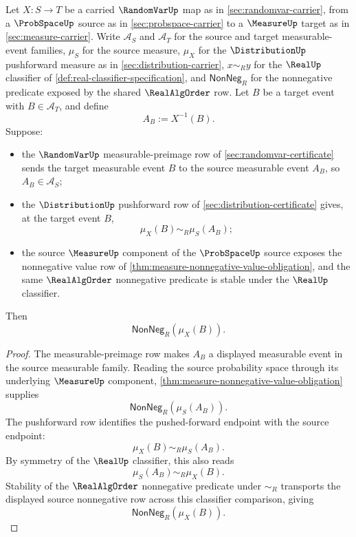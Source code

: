 \begin{theorem}
\label{thm:distribution-nonnegative-value-inheritance}
Let $X:S\to T$ be a carried $\RandomVarUp$ map as in \autoref{sec:randomvar-carrier}, from a $\ProbSpaceUp$ source as in \autoref{sec:probspace-carrier} to a $\MeasureUp$ target as in \autoref{sec:measure-carrier}. Write $\mathcal{A}_S$ and $\mathcal{A}_T$ for the source and target measurable-event families, $\mu_S$ for the source measure, $\mu_X$ for the $\DistributionUp$ pushforward measure as in \autoref{sec:distribution-carrier}, $x\sim_R y$ for the $\RealUp$ classifier of \autoref{def:real-classifier-specification}, and $\mathsf{NonNeg}_R$ for the nonnegative predicate exposed by the shared $\RealAlgOrder$ row. Let $B$ be a target event with $B\in\mathcal{A}_T$, and define
$$
A_B:=X^{-1}(B).
$$
Suppose:
\begin{itemize}
\item the $\RandomVarUp$ measurable-preimage row of \autoref{sec:randomvar-certificate} sends the target measurable event $B$ to the source measurable event $A_B$, so $A_B\in\mathcal{A}_S$;
\item the $\DistributionUp$ pushforward row of \autoref{sec:distribution-certificate} gives, at the target event $B$,
$$
\mu_X(B)\sim_R\mu_S(A_B);
$$
\item the source $\MeasureUp$ component of the $\ProbSpaceUp$ source exposes the nonnegative value row of \autoref{thm:measure-nonnegative-value-obligation}, and the same $\RealAlgOrder$ nonnegative predicate is stable under the $\RealUp$ classifier.
\end{itemize}
Then
$$
\mathsf{NonNeg}_R(\mu_X(B)).
$$
\end{theorem}
\begin{proof}
The measurable-preimage row makes $A_B$ a displayed measurable event in the source measurable family. Reading the source probability space through its underlying $\MeasureUp$ component, \autoref{thm:measure-nonnegative-value-obligation} supplies
$$
\mathsf{NonNeg}_R(\mu_S(A_B)).
$$
The pushforward row identifies the pushed-forward endpoint with the source endpoint:
$$
\mu_X(B)\sim_R\mu_S(A_B).
$$
By symmetry of the $\RealUp$ classifier, this also reads
$$
\mu_S(A_B)\sim_R\mu_X(B).
$$
Stability of the $\RealAlgOrder$ nonnegative predicate under $\sim_R$ transports the displayed source nonnegative row across this classifier comparison, giving
$$
\mathsf{NonNeg}_R(\mu_X(B)).
$$
\end{proof}

